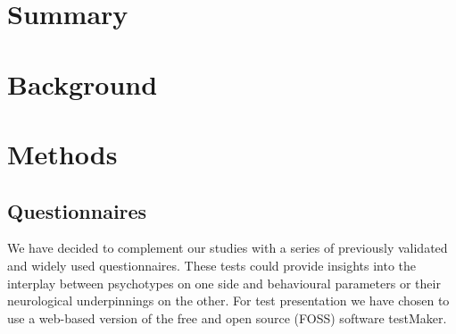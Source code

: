 
\chapter{Summary}
\readme
\chapter{Background}
    \section{}
\chapter{Methods}
    \section{Questionnaires}
    We have decided to complement our studies with a series of previously validated and widely used questionnaires.
    These tests could provide insights into the interplay between psychotypes on one side and behavioural parameters or their neurological underpinnings on the other.
    For test presentation we have chosen to use a web-based version of the free and open source (FOSS) software testMaker\cite{testmaker}.
    
